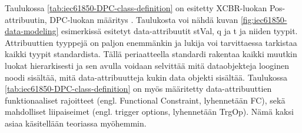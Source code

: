 Taulukossa \ref{tab:iec61850-DPC-class-definition} on esitetty XCBR-luokan Pos-attribuutin, DPC-luokan määritys \cite[s.~44]{IEC61850-7-3}. Taulukosta voi nähdä kuvan \ref{fig:iec61850-data-modeling} esimerkissä esitetyt data-attribuutit stVal, q ja t ja niiden tyypit. Attribuuttien tyyppejä on paljon enemmänkin ja lukija voi tarvittaessa tarkistaa kaikki tyypit standardista. Tällä periaatteella standardi rakentaa kaikki muutkin luokat hierarkisesti ja sen avulla voidaan selvittää mitä dataobjekteja looginen noodi sisältää, mitä data-attribuutteja kukin data objekti sisältää. Taulukossa \ref{tab:iec61850-DPC-class-definition} on myös määritetty data-attribuuttien funktionaaliset rajoitteet (engl. Functional Constraint, lyhennetään FC), sekä mahdolliset liipaiseimet (engl. trigger options, lyhennetään TrgOp). Nämä kaksi asiaa käsitellään teoriassa myöhemmin.

